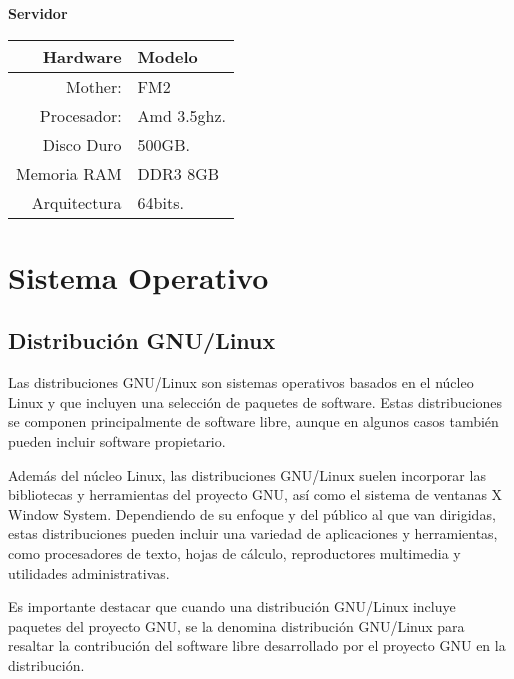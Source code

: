 			\vspace{0.3cm}
		
			\textbf{Servidor}	

		
			\begin{center}			
				\begin{tabular}{| r | l |}
					\hline
					Hardware & Modelo \\ \hline
					Mother: & FM2 \\ 
					Procesador: & Amd 3.5ghz. \\
					Disco Duro & 500GB. \\
					Memoria RAM & DDR3 8GB \\
					Arquitectura & 64bits.\\ \hline
				\end{tabular}
			\end{center} 
					
		\vspace{0.3cm}
		
	
	\section{Sistema Operativo}
		
		\subsection{Distribución GNU/Linux}
			
Las distribuciones GNU/Linux son sistemas operativos basados en el núcleo Linux y que incluyen una selección de paquetes de software. Estas distribuciones se componen principalmente de software libre, aunque en algunos casos también pueden incluir software propietario.\par

Además del núcleo Linux, las distribuciones GNU/Linux suelen incorporar las bibliotecas y herramientas del proyecto GNU, así como el sistema de ventanas X Window System. Dependiendo de su enfoque y del público al que van dirigidas, estas distribuciones pueden incluir una variedad de aplicaciones y herramientas, como procesadores de texto, hojas de cálculo, reproductores multimedia y utilidades administrativas.\par

Es importante destacar que cuando una distribución GNU/Linux incluye paquetes del proyecto GNU, se la denomina distribución GNU/Linux para resaltar la contribución del software libre desarrollado por el proyecto GNU en la distribución.\par			
			
